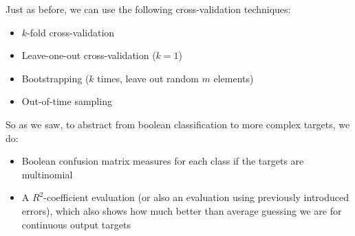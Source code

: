 Just as before, we can use the following cross-validation techniques:
\begin{itemize}
  \item $k$-fold cross-validation
  \item Leave-one-out cross-validation ($k=1$)
  \item Bootstrapping ($k$ times, leave out random $m$ elements)
  \item Out-of-time sampling
\end{itemize}

So as we saw, to abstract from boolean classification to more complex targets, we do:
\begin{itemize}
  \item Boolean confusion matrix measures for each class if the targets are multinomial
  \item A $R^2$-coefficient evaluation (or also an evaluation using previously introduced errors), which also shows how much better than average guessing we are for continuous output targets
\end{itemize}
